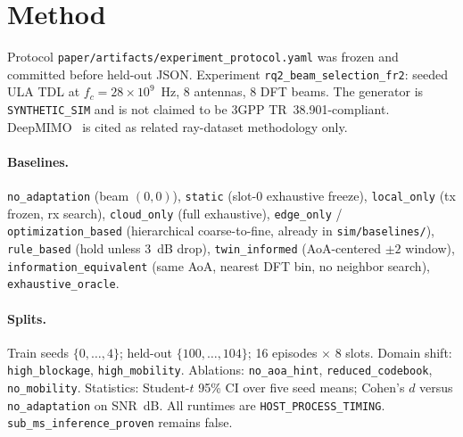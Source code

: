 \section{Method}
Protocol \texttt{paper/artifacts/experiment\_protocol.yaml} was frozen and committed before held-out JSON.
Experiment \texttt{rq2\_beam\_selection\_fr2}: seeded ULA TDL at $f_c=28\times10^9$~Hz, 8 antennas, 8 DFT beams.
The generator is \texttt{SYNTHETIC\_SIM} and is not claimed to be 3GPP TR~38.901-compliant.
DeepMIMO~\cite{alkhateeb2019deepmimo} is cited as related ray-dataset methodology only.

\paragraph{Baselines.}
\texttt{no\_adaptation} (beam $(0,0)$), \texttt{static} (slot-0 exhaustive freeze), \texttt{local\_only} (tx frozen, rx search), \texttt{cloud\_only} (full exhaustive), \texttt{edge\_only} / \texttt{optimization\_based} (hierarchical coarse-to-fine, already in \texttt{sim/baselines/}), \texttt{rule\_based} (hold unless 3~dB drop), \texttt{twin\_informed} (AoA-centered $\pm2$ window), \texttt{information\_equivalent} (same AoA, nearest DFT bin, no neighbor search), \texttt{exhaustive\_oracle}.

\paragraph{Splits.}
Train seeds $\{0,\ldots,4\}$; held-out $\{100,\ldots,104\}$; 16 episodes $\times$ 8 slots.
Domain shift: \texttt{high\_blockage}, \texttt{high\_mobility}.
Ablations: \texttt{no\_aoa\_hint}, \texttt{reduced\_codebook}, \texttt{no\_mobility}.
Statistics: Student-$t$ 95\% CI over five seed means; Cohen's $d$ versus \texttt{no\_adaptation} on SNR~dB.
All runtimes are \texttt{HOST\_PROCESS\_TIMING}. \texttt{sub\_ms\_inference\_proven} remains false.
